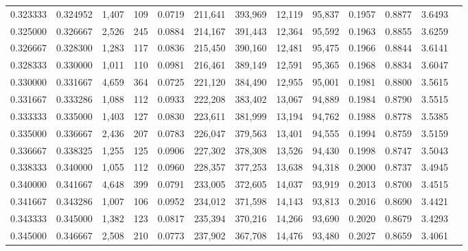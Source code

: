 \begin{tabular}{rrrrrrrrrrrrr}
0.323333 & 0.324952 & 1,407 & 109 &                                     0.0719 & 211,641 & 393,969 &  12,119 &  95,837 & 0.1957 & 0.8877 & 3.6493 \\
0.325000 & 0.326667 & 2,526 & 245 &                                     0.0884 & 214,167 & 391,443 &  12,364 &  95,592 & 0.1963 & 0.8855 & 3.6259 \\
0.326667 & 0.328300 & 1,283 & 117 &                                     0.0836 & 215,450 & 390,160 &  12,481 &  95,475 & 0.1966 & 0.8844 & 3.6141 \\
0.328333 & 0.330000 & 1,011 & 110 &                                     0.0981 & 216,461 & 389,149 &  12,591 &  95,365 & 0.1968 & 0.8834 & 3.6047 \\
0.330000 & 0.331667 & 4,659 & 364 &                                     0.0725 & 221,120 & 384,490 &  12,955 &  95,001 & 0.1981 & 0.8800 & 3.5615 \\
0.331667 & 0.333286 & 1,088 & 112 &                                     0.0933 & 222,208 & 383,402 &  13,067 &  94,889 & 0.1984 & 0.8790 & 3.5515 \\
0.333333 & 0.335000 & 1,403 & 127 &                                     0.0830 & 223,611 & 381,999 &  13,194 &  94,762 & 0.1988 & 0.8778 & 3.5385 \\
0.335000 & 0.336667 & 2,436 & 207 &                                     0.0783 & 226,047 & 379,563 &  13,401 &  94,555 & 0.1994 & 0.8759 & 3.5159 \\
0.336667 & 0.338325 & 1,255 & 125 &                                     0.0906 & 227,302 & 378,308 &  13,526 &  94,430 & 0.1998 & 0.8747 & 3.5043 \\
0.338333 & 0.340000 & 1,055 & 112 &                                     0.0960 & 228,357 & 377,253 &  13,638 &  94,318 & 0.2000 & 0.8737 & 3.4945 \\
0.340000 & 0.341667 & 4,648 & 399 &                                     0.0791 & 233,005 & 372,605 &  14,037 &  93,919 & 0.2013 & 0.8700 & 3.4515 \\
0.341667 & 0.343286 & 1,007 & 106 &                                     0.0952 & 234,012 & 371,598 &  14,143 &  93,813 & 0.2016 & 0.8690 & 3.4421 \\
0.343333 & 0.345000 & 1,382 & 123 &                                     0.0817 & 235,394 & 370,216 &  14,266 &  93,690 & 0.2020 & 0.8679 & 3.4293 \\
0.345000 & 0.346667 & 2,508 & 210 &                                     0.0773 & 237,902 & 367,708 &  14,476 &  93,480 & 0.2027 & 0.8659 & 3.4061 \\

\end{tabular}
